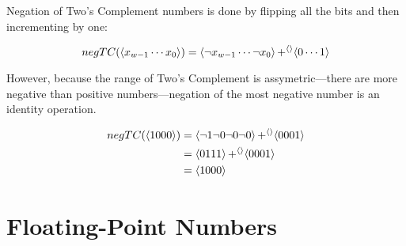 Negation of Two's Complement numbers is done by flipping all the bits
and then incrementing by one:

\begin{definition}
  \[
    negTC(\langle x_{w-1}\cdots{}x_{0} \rangle) = \langle \neg{}x_{w-1}\cdots{}\neg{}x_{0} \rangle \operatorname{+^{\langle\rangle}} \langle 0\cdots{}1 \rangle
  \]
\end{definition}

However, because the range of Two's Complement is assymetric---there
are more negative than positive numbers---negation of the most
negative number is an identity operation.

\begin{example}
  \begin{align*}
    negTC(\langle 1000 \rangle)
    &= \langle \neg 1 \neg 0 \neg 0 \neg 0 \rangle \operatorname{+^{\langle\rangle}} \langle 0001 \rangle \\
    &= \langle 0 1 1 1 \rangle \operatorname{+^{\langle\rangle}} \langle 0001 \rangle \\
    &= \langle 1 0 0 0 \rangle \\
  \end{align*}
\end{example}

\section{Floating-Point Numbers}
\label{sec:floats}

